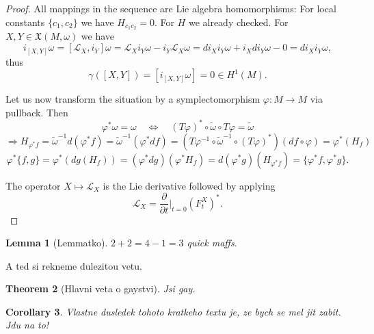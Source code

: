 \documentclass{article}
\newtheorem{theorem}{Theorem}
\newtheorem{lemma}[theorem]{Lemma} %
\newtheorem{corollary}[theorem]{Corollary}
\theoremstyle{definition}
\begin{document}
\begin{proof}
    All mappings in the sequence are Lie algebra homomorphisms: For local constants $\{c_1, c_2\}$ we have $H_{c_1 c_2} = 0$. For $H$ we already checked. For $X, Y \in \mathfrak{X}(M, \omega)$ we have
    \[
    i_{[X, Y]} \omega = [\mathcal{L}_X, i_Y] \omega = \mathcal{L}_X i_Y \omega - i_Y \mathcal{L}_X \omega = d i_X i_Y \omega + i_X d i_Y \omega - 0 = d i_X i_Y \omega,
    \]
    thus 
    \[
    \gamma([X, Y]) = [i_{[X, Y]} \omega] = 0 \in H^1(M).
    \]

    Let us now transform the situation by a symplectomorphism $\varphi: M \to M$ via pullback. Then
    \[
    \varphi^* \omega = \omega \quad \Leftrightarrow \quad (T\varphi)^* \circ \tilde{\omega} \circ T\varphi = \tilde{\omega}
    \]
    \[
    \Rightarrow H_{\varphi^* f} = \tilde{\omega}^{-1} d(\varphi^* f) = \tilde{\omega}^{-1} (\varphi^* df) 
    = (T\varphi^{-1} \circ \tilde{\omega}^{-1} \circ (T\varphi)^*) (d f \circ \varphi)
    = \varphi^*(H_f)
    \]
    \[
    \varphi^* \{f, g\} = \varphi^* (d g (H_f)) = ( \varphi^* dg ) ( \varphi^* H_f ) = d(\varphi^* g)(H_{\varphi^* f}) = \{ \varphi^* f, \varphi^* g \}.
    \]

    The operator $X \mapsto \mathcal{L}_X$ is the Lie derivative followed by applying 
    \[
    \mathcal{L}_X = \frac{\partial}{\partial t} \bigg|_{t=0} (F_t^X)^*.
    \]

\end{proof}


\begin{lemma}[Lemmatko]
$2+2 = 4 - 1 = 3$ quick maffs.
\end{lemma}

A ted si rekneme dulezitou vetu.
\begin{theorem}[Hlavni veta o gaystvi]
Jsi gay.
\end{theorem}


\begin{corollary}
    Vlastne dusledek tohoto kratkeho textu je, ze bych se mel jit zabit. Jdu na to!
\end{corollary}
\end{document}
